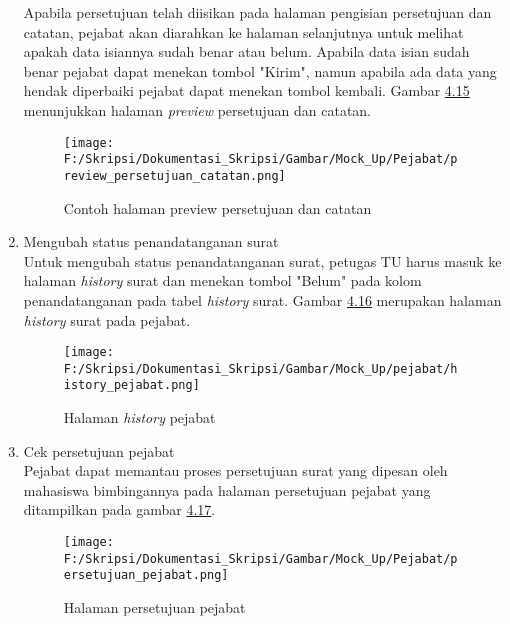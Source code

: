\begin{enumerate}
	Apabila persetujuan telah diisikan pada halaman pengisian persetujuan dan catatan, pejabat akan diarahkan ke halaman selanjutnya untuk melihat apakah data isiannya sudah benar atau belum. Apabila data isian sudah benar pejabat dapat menekan tombol "Kirim", namun apabila ada data yang hendak diperbaiki pejabat dapat menekan tombol kembali. Gambar \hyperlink{halaman_preview_persetujuan_dan_catatan}{4.15} menunjukkan halaman \textit{preview} persetujuan dan catatan.
	\begin{figure}[H]
	\centering
		\texttt{[image: F:/Skripsi/Dokumentasi\_Skripsi/Gambar/Mock\_Up/Pejabat/preview\_persetujuan\_catatan.png]}
		\caption{Contoh halaman preview persetujuan dan catatan}
		\label{fig:halaman_preview_persetujuan_dan_catatan}
	\end{figure}
	
	\item Mengubah status penandatanganan surat \\
	Untuk mengubah status penandatanganan surat, petugas TU harus masuk ke halaman \textit{history} surat dan menekan tombol "Belum" pada kolom penandatanganan pada tabel \textit{history} surat. Gambar \hyperlink{halaman_history_pejabat}{4.16} merupakan halaman \textit{history} surat pada pejabat.
	\begin{figure}[H]
	\centering
		\texttt{[image: F:/Skripsi/Dokumentasi\_Skripsi/Gambar/Mock\_Up/pejabat/history\_pejabat.png]}
		\caption{Halaman \textit{history} pejabat}
		\label{fig:halaman_history_pejabat}
	\end{figure}

	\item Cek persetujuan pejabat\\
	Pejabat dapat memantau proses persetujuan surat yang dipesan oleh mahasiswa bimbingannya pada halaman persetujuan pejabat yang ditampilkan pada gambar \hyperlink{halaman_persetujuan_pejabat}{4.17}.
	\begin{figure}[H]
	\centering
		\texttt{[image: F:/Skripsi/Dokumentasi\_Skripsi/Gambar/Mock\_Up/Pejabat/persetujuan\_pejabat.png]}
		\caption{Halaman persetujuan pejabat}
		\label{fig:halaman_persetujuan_pejabat}
	\end{figure}
\end{enumerate}

